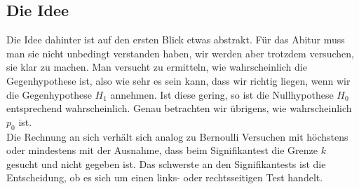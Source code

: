 \subsection{Die Idee}
Die Idee dahinter ist auf den ersten Blick etwas abstrakt. Für das Abitur muss man sie nicht unbedingt verstanden haben, wir werden aber trotzdem versuchen, sie klar zu machen. Man versucht zu ermitteln, wie wahrscheinlich die Gegenhypothese ist, also wie sehr es sein kann, dass wir richtig liegen, wenn wir die Gegenhypothese \(H_1\) annehmen. Ist diese gering, so ist die Nullhypothese \(H_0\) entsprechend wahrscheinlich. Genau betrachten wir übrigens, wie wahrscheinlich \(p_0\) ist.\\
Die Rechnung an sich verhält sich analog zu Bernoulli Versuchen mit höchstens oder mindestens mit der Ausnahme, dass beim Signifikantest die Grenze $k$ gesucht und nicht gegeben ist. Das schwerste an den Signifikantests ist die Entscheidung, ob es sich um einen links- oder rechtsseitigen Test handelt. 
